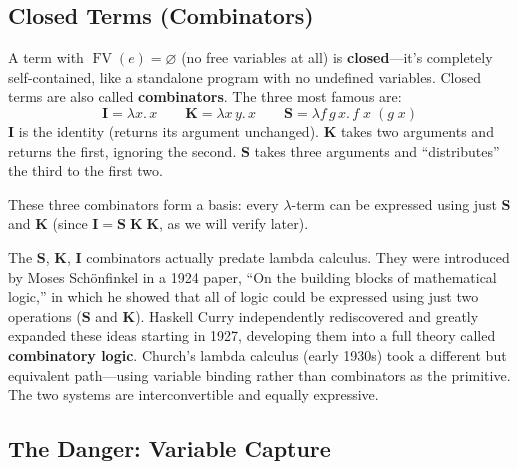 \documentclass[11pt,a4paper]{article}
\theoremstyle{definition}
\newcommand{\lam}{\lambda}
\newcommand{\FV}{\operatorname{FV}}
\begin{document}
\subsection{Closed Terms (Combinators)}

A term with $\FV(e) = \varnothing$ (no free variables at all) is
\textbf{closed}---it's completely self-contained, like a standalone program
with no undefined variables. Closed terms are also called \textbf{combinators}.
The three most famous are:
\[
  \mathbf{I} = \lam x.\, x
  \qquad
  \mathbf{K} = \lam x\, y.\, x
  \qquad
  \mathbf{S} = \lam f\, g\, x.\, f\;x\;(g\;x)
\]
$\mathbf{I}$ is the identity (returns its argument unchanged). $\mathbf{K}$
takes two arguments and returns the first, ignoring the second. $\mathbf{S}$
takes three arguments and ``distributes'' the third to the first two.

These three combinators form a basis: every $\lam$-term can be expressed using
just $\mathbf{S}$ and $\mathbf{K}$ (since $\mathbf{I} = \mathbf{S}\;\mathbf{K}\;\mathbf{K}$, as we will verify later).

\begin{intuition}
The $\mathbf{S}$, $\mathbf{K}$, $\mathbf{I}$ combinators actually predate
lambda calculus. They were introduced by Moses Sch\"onfinkel in a 1924 paper,
``On the building blocks of mathematical logic,'' in which he showed that
all of logic could be expressed using just two operations ($\mathbf{S}$ and
$\mathbf{K}$). Haskell Curry independently rediscovered and greatly expanded
these ideas starting in 1927, developing them into a full theory called
\textbf{combinatory logic}. Church's lambda calculus (early 1930s) took a different
but equivalent path---using variable binding rather than combinators as the
primitive. The two systems are interconvertible and equally expressive.
\end{intuition}

\subsection{The Danger: Variable Capture}
\end{document}
